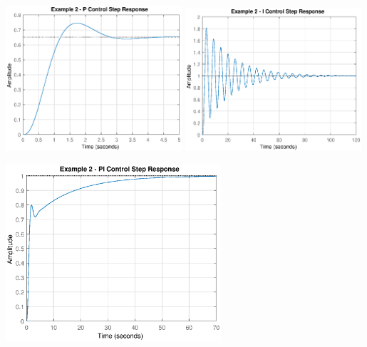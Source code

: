 \documentclass{book}
\begin{document}
\begin{center}
	\includegraphics[width=0.49\textwidth,trim={1cm 0 1cm 0},clip]{Lecture12Example2PStep.eps}
	\hfill
	\includegraphics[width=0.49\textwidth,trim={1cm 0 1cm 0},clip]{Lecture12Example2IStep.eps}
	
	\includegraphics[width=0.6\textwidth]{Lecture12Example2PIStep.eps}
\end{center}

\clearpage
\end{document}
